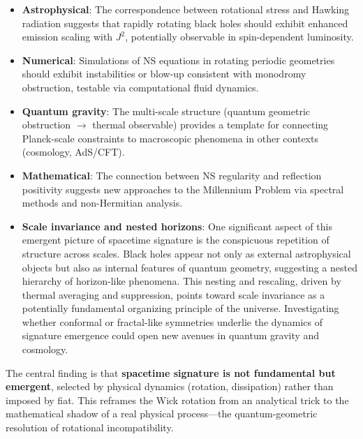 \documentclass[11pt]{article}
\begin{document}
\begin{itemize}
\item \textbf{Astrophysical}: The correspondence between rotational stress and 
Hawking radiation suggests that rapidly rotating black holes should exhibit enhanced 
emission scaling with $J^2$, potentially observable in spin-dependent luminosity.

\item \textbf{Numerical}: Simulations of NS equations in rotating periodic geometries 
should exhibit instabilities or blow-up consistent with monodromy obstruction, 
testable via computational fluid dynamics.

\item \textbf{Quantum gravity}: The multi-scale structure (quantum geometric 
obstruction $\to$ thermal observable) provides a template for connecting Planck-scale 
constraints to macroscopic phenomena in other contexts (cosmology, AdS/CFT).

\item \textbf{Mathematical}: The connection between NS regularity and reflection 
positivity suggests new approaches to the Millennium Problem via spectral methods 
and non-Hermitian analysis.

\item \textbf{Scale invariance and nested horizons}: One significant aspect of this emergent picture of spacetime signature is the conspicuous repetition of structure across scales. Black holes appear not only as external astrophysical objects but also as internal features of quantum geometry, suggesting a nested hierarchy of horizon-like phenomena. This nesting and rescaling, driven by thermal averaging and suppression, points toward scale invariance as a potentially fundamental organizing principle of the universe. Investigating whether conformal or fractal-like symmetries underlie the dynamics of signature emergence could open new avenues in quantum gravity and cosmology.

\end{itemize}

The central finding is that \textbf{spacetime signature is not fundamental but 
emergent}, selected by physical dynamics (rotation, dissipation) rather than imposed 
by fiat. This reframes the Wick rotation from an analytical trick to the mathematical 
shadow of a real physical process---the quantum-geometric resolution of rotational 
incompatibility.



\end{document}
